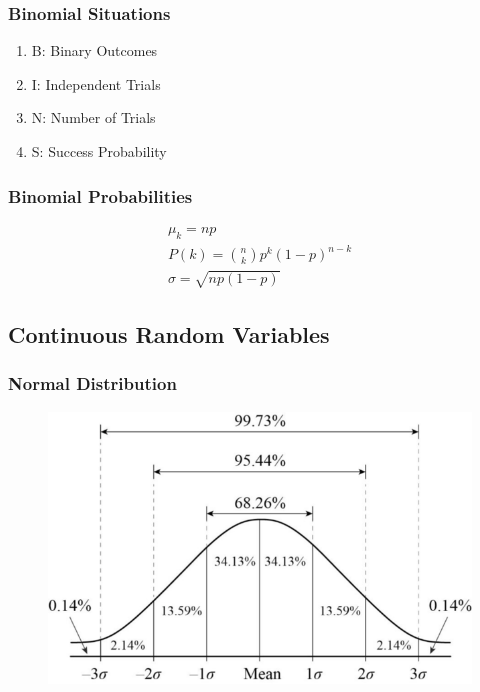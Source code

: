\documentclass[12pt]{article}
\numberwithin{equation}{section}
\begin{document}
\subsubsection{Binomial Situations}
\begin{enumerate}
    \item B: Binary Outcomes
    \item I: Independent Trials
    \item N: Number of Trials
    \item S: Success Probability
\end{enumerate}
\subsubsection{Binomial Probabilities}
\begin{gather}
    \mu_k = np \\
    P(k) = \binom{n}{k} p^k (1-p)^{n-k} \\
    \sigma = \sqrt{np(1-p)}
\end{gather}

\subsection{Continuous Random Variables}
\subsubsection{Normal Distribution}
\begin{figure}[!ht]
    \centering
    \includegraphics[width=0.8\linewidth]{figures and tables/normalcurve.png}
\end{figure}
\end{document}
